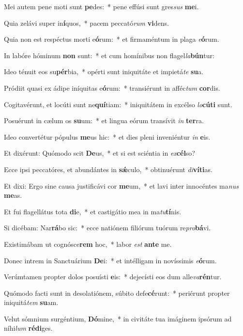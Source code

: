 \item Mei autem pene moti sunt \textbf{pe}des:~* pene effúsi sunt gres\textit{sus} \textbf{me}i.
\item Quia zelávi super in\textbf{í}quos,~* pacem peccató\textit{rum} \textbf{vi}dens.
\item Quia non est respéctus morti e\textbf{ó}rum:~* et firmaméntum in plaga \textit{e}\textbf{ó}rum.
\item In labóre hóminum \textbf{non} sunt:~* et cum homínibus non flagel\textit{la}\textbf{bún}tur:
\item Ideo ténuit eos su\textbf{pér}bia,~* opérti sunt iniquitáte et impietá\textit{te} \textbf{su}a.
\item Pródiit quasi ex ádipe iníquitas e\textbf{ó}rum:~* transiérunt in afféc\textit{tum} \textbf{cor}dis.
\item Cogitavérunt, et locúti sunt ne\textbf{quí}tiam:~* iniquitátem in excélso \textit{lo}\textbf{cú}\textbf{ti} sunt.
\item Posuérunt in cælum os \textbf{su}um:~* et lingua eórum transívit \textit{in} \textbf{ter}ra.
\item Ideo convertétur pópulus \textbf{me}us hic:~* et dies pleni inveniéntur \textit{in} \textbf{e}is.
\item Et dixérunt: Quómodo scit \textbf{De}us,~* et si est sciéntia in \textit{ex}\textbf{cél}so?
\item Ecce ipsi peccatóres, et abundántes in \textbf{sǽ}culo,~* obtinuérunt \textit{di}\textbf{ví}\textbf{ti}as.
\item Et dixi: Ergo sine causa justificávi cor \textbf{me}um,~* et lavi inter innocéntes ma\textit{nus} \textbf{me}as.
\item Et fui flagellátus tota \textbf{di}e,~* et castigátio mea in ma\textit{tu}\textbf{tí}nis.
\item Si dicébam: Nar\textbf{rá}bo sic:~* ecce natiónem filiórum tuórum re\textit{pro}\textbf{bá}vi.
\item Existimábam ut cognósce\textbf{rem} hoc,~* labor \textit{est} \textbf{an}\textbf{te} me.
\item Donec intrem in Sanctuárium \textbf{De}i:~* et intélligam in novíssimis \textit{e}\textbf{ó}rum.
\item Verúmtamen propter dolos posuísti \textbf{e}is:~* dejecísti eos dum alle\textit{va}\textbf{rén}tur.
\item Quómodo facti sunt in desolatiónem, súbito defe\textbf{cé}runt:~* periérunt propter iniquitá\textit{tem} \textbf{su}am.
\item Velut sómnium surgéntium, \textbf{Dó}mine,~* in civitáte tua imáginem ipsórum ad níhi\textit{lum} \textbf{réd}\textbf{i}ges.

